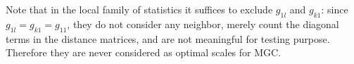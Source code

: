 \documentclass[11pt]{article}
\begin{document}
Note that in the local family of statistics it suffices to exclude $g_{1l}$ and $g_{k1}$: since $g_{1l}=g_{k1}=g_{11}$, they do not consider any neighbor, merely count the diagonal terms in the distance matrices, and are not meaningful for testing purpose. Therefore they are never considered as optimal scales for MGC.





\end{document}
